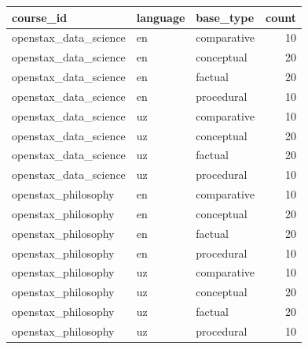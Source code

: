 \begin{tabular}{lllr}
\toprule
course_id & language & base_type & count \\
\midrule
openstax_data_science & en & comparative & 10 \\
openstax_data_science & en & conceptual & 20 \\
openstax_data_science & en & factual & 20 \\
openstax_data_science & en & procedural & 10 \\
openstax_data_science & uz & comparative & 10 \\
openstax_data_science & uz & conceptual & 20 \\
openstax_data_science & uz & factual & 20 \\
openstax_data_science & uz & procedural & 10 \\
openstax_philosophy & en & comparative & 10 \\
openstax_philosophy & en & conceptual & 20 \\
openstax_philosophy & en & factual & 20 \\
openstax_philosophy & en & procedural & 10 \\
openstax_philosophy & uz & comparative & 10 \\
openstax_philosophy & uz & conceptual & 20 \\
openstax_philosophy & uz & factual & 20 \\
openstax_philosophy & uz & procedural & 10 \\
\bottomrule
\end{tabular}
